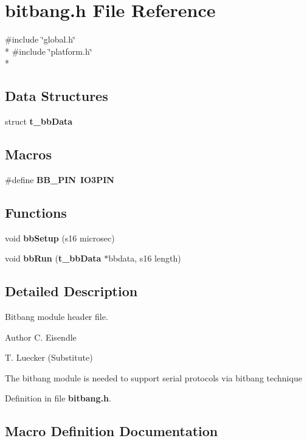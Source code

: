 \section{bitbang.\-h File Reference}
\label{bitbang_8h}
{\ttfamily \#include \char`\"{}global.\-h\char`\"{}}\\*
{\ttfamily \#include \char`\"{}platform.\-h\char`\"{}}\\*
\subsection*{Data Structures}
\begin{DoxyCompactItemize}
\item 
struct {\bf t\-\_\-bb\-Data}
\end{DoxyCompactItemize}
\subsection*{Macros}
\begin{DoxyCompactItemize}
\item 
\#define {\bf B\-B\-\_\-\-P\-I\-N}~{\bf I\-O3\-P\-I\-N}
\end{DoxyCompactItemize}
\subsection*{Functions}
\begin{DoxyCompactItemize}
\item 
void {\bf bb\-Setup} (s16 microsec)
\item 
void {\bf bb\-Run} ({\bf t\-\_\-bb\-Data} $\ast$bbdata, s16 length)
\end{DoxyCompactItemize}


\subsection{Detailed Description}
Bitbang module header file. \begin{DoxyAuthor}{Author}
C. Eisendle 

T. Luecker (Substitute)
\end{DoxyAuthor}
The bitbang module is needed to support serial protocols via bitbang technique 

Definition in file {\bf bitbang.\-h}.



\subsection{Macro Definition Documentation}
